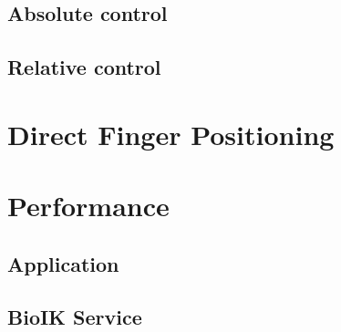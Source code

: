 \subsection{Absolute control}

\subsection{Relative control}

\section{Direct Finger Positioning}

\section{Performance}

\subsection{Application}

\subsection{BioIK Service}
